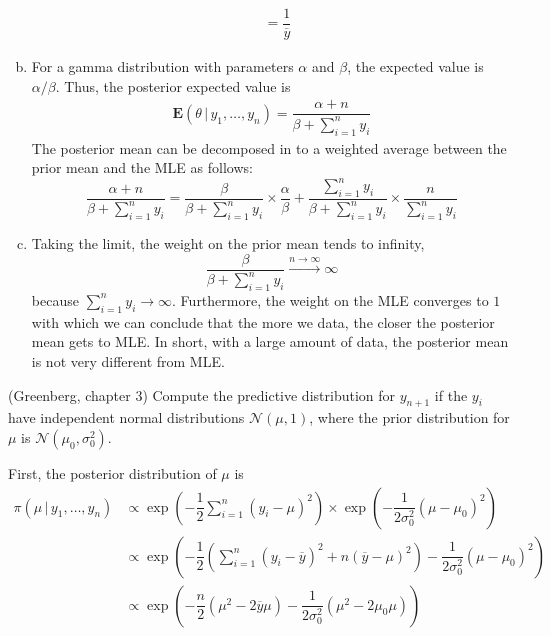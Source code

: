 \documentclass[answers]{exam}
\begin{document}
\begin{questions}
\begin{solution}
\begin{enumerate}[(a)]
\begin{align}
        &= \dfrac{1}{\overline{y}}
      \end{align}
      \item For a gamma distribution with parameters $\alpha$ and $\beta$, the expected value is $\alpha/\beta$. Thus, the posterior expected value is
      \begin{align}
        \mathbf{E}\left(\theta\,|\,y_{1},\ldots,y_{n}\right) = \dfrac{\alpha+n}{\beta+\sum_{i=1}^{n}y_{i}}
      \end{align}
      The posterior mean can be decomposed in to a weighted average between the prior mean and the MLE as follows:
      \begin{equation}
        \dfrac{\alpha+n}{\beta+\sum_{i=1}^{n}y_{i}} = \dfrac{\beta}{\beta+\sum_{i=1}^{n}y_{i}}\times \dfrac{\alpha}{\beta}+\dfrac{\sum_{i=1}^{n}y_{i}}{\beta+\sum_{i=1}^{n}y_{i}}\times\dfrac{n}{\sum_{i=1}^{n}y_{i}}
      \end{equation}
      \item Taking the limit, the weight on the prior mean tends to infinity,
      \begin{equation}
        \dfrac{\beta}{\beta+\sum_{i=1}^{n}y_{i}}\xrightarrow{n\to\infty} \infty
      \end{equation}
      because $\sum_{i=1}^{n}y_{i}\to\infty$. Furthermore, the weight on the MLE converges to $1$ with which we can conclude that the more we data, the closer the posterior mean gets to MLE. In short, with a large amount of data, the posterior mean is not very different from MLE.
    \end{enumerate}
  \end{solution}
  \question
  (Greenberg, chapter 3) Compute the predictive distribution for $y_{n+1}$ if the $y_{i}$ have independent normal distributions $\mathcal{N}(\mu,1)$, where the prior distribution for $\mu$ is $\mathcal{N}(\mu_{0},\sigma_{0}^{2})$.
  \begin{solution}
    First, the posterior distribution of $\mu$ is
    \begin{align}
      \pi\left(\mu\,|\,y_{1},\ldots,y_{n}\right) &\propto \exp\left(-\dfrac{1}{2}\sum_{i=1}^{n}\left(y_{i}-\mu\right)^{2}\right)\times\exp\left(-\dfrac{1}{2\sigma_{0}^{2}}\left(\mu-\mu_{0}\right)^{2}\right)\\
      &\propto \exp\left(-\dfrac{1}{2}\left(\sum_{i=1}^{n}\left(y_{i}-\overline{y}\right)^{2}+n\left(\overline{y}-\mu\right)^{2}\right)-\dfrac{1}{2\sigma_{0}^{2}}\left(\mu-\mu_{0}\right)^{2}\right)\\
      &\propto \exp\left(-\dfrac{n}{2}\left(\mu^{2}-2\overline{y}\mu\right)-\dfrac{1}{2\sigma_{0}^{2}}\left(\mu^{2}-2\mu_{0}\mu\right)\right)\\

\end{align}
\end{solution}
\end{questions}
\end{document}
